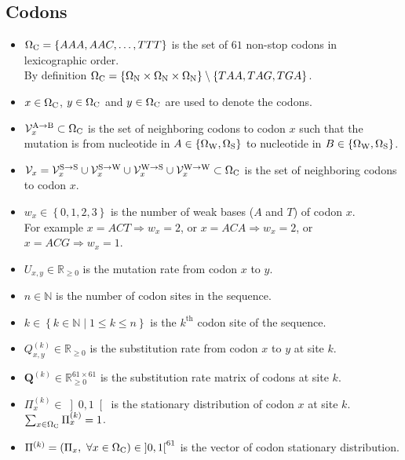 \subsection{Codons}
\begin{itemize}
	\item $\Omega_{\mathrm{C}} = \left\{ AAA,AAC, \dots, TTT \right\} $ is the set of $61$ non-stop codons in lexicographic order.
	\\By definition $\Omega_{\mathrm{C}} = \left\{ \Omega_{\mathrm{N}} \times \Omega_{\mathrm{N}} \times \Omega_{\mathrm{N}} \right\} \setminus \left\{ TAA, TAG, TGA \right\} $.
	\item $x \in \Omega_{\mathrm{C}} $, $y \in \Omega_{\mathrm{C}} $ and $y \in \Omega_{\mathrm{C}} $ are used to denote the codons.
	\item $\mathcal{V}_x^{\mathrm{A} \rightarrow \mathrm{B}} \subset \Omega_{\mathrm{C}} $ is the set of neighboring codons to codon $x$ such that the mutation is from nucleotide in $A \in \left\{ \Omega_{\mathrm{W}}, \Omega_{\mathrm{S}} \right\}$ to nucleotide in $B \in \left\{ \Omega_{\mathrm{W}}, \Omega_{\mathrm{S}} \right\}$.
	\item $\mathcal{V}_x =  \mathcal{V}_x^{\mathrm{S} \rightarrow \mathrm{S}} \cup \mathcal{V}_x^{\mathrm{S} \rightarrow \mathrm{W}} \cup \mathcal{V}_x^{\mathrm{W} \rightarrow \mathrm{S}} \cup \mathcal{V}_x^{\mathrm{W} \rightarrow \mathrm{W}} \subset \Omega_{\mathrm{C}} $ is the set of neighboring codons to codon $x$.
	\item $w_x \in \left\{0,1,2,3 \right\}$ is the number of weak bases ($A$ and $T$) of codon $x$.
	\\For example $x=ACT \Rightarrow w_x=2$, or  $x=ACA \Rightarrow w_x=2$, or $x=ACG \Rightarrow w_x=1$.
	\item $U_{x,y} \in \mathbb{R}_{\geq 0} $ is the mutation rate from codon $x$ to $y$.
	\item $n \in \mathbb{N}$ is the number of codon sites in the sequence.
	\item $k \in \left\{ k \in \mathbb{N} \mid 1 \leq k \leq n \right\}$ is the $k^{\mathrm{th}}$ codon site of the sequence.
	\item $Q_{x,y}^{(k)} \in \mathbb{R}_{\geq 0} $ is the substitution rate from codon $x$ to $y$ at site $k$.
	\item $\bm{Q}^{(k)} \in \mathbb{R}_{\geq 0}^{61 \times 61} $ is the substitution rate matrix of codons at site $k$.
	\item $\Pi_x^{(k)} \in \left]0,1\right[ $ is the stationary distribution of codon $x$ at site $k$. $\sum_{x \in \Omega_{\mathrm{C}}} \Pi_x^{(k)} = 1$.
	\item $\Pi^{(k)} = \left( \Pi_x , \ \forall x \in \Omega_{\mathrm{C}} \right) \in \left]0,1\right[^{61} $ is the vector of codon stationary distribution.
\end{itemize}

